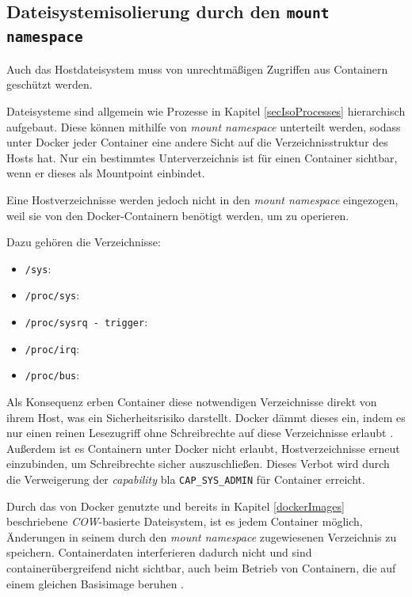 \documentclass[../main.tex]{subfiles}
\begin{document}

    \subsection{Dateisystemisolierung durch den \texttt{mount namespace}}
			Auch das Hostdateisystem muss von unrechtmäßigen Zugriffen aus Containern geschützt werden.

			Dateisysteme sind allgemein wie Prozesse in Kapitel \ref{secIsoProcesses} hierarchisch aufgebaut. Diese können mithilfe von \emph{mount namespace} unterteilt werden, sodass unter Docker jeder Container eine andere Sicht auf die Verzeichnisstruktur des Hosts hat. Nur ein bestimmtes Unterverzeichnis ist für einen Container sichtbar, wenn er dieses als Mountpoint einbindet.

			Eine Hostverzeichnisse werden jedoch nicht in den \emph{mount namespace} eingezogen, weil sie von den Docker-Containern benötigt werden, um zu operieren.

			Dazu gehören die Verzeichnisse:

			\begin{itemize}
				\item \texttt{/sys}:
				\item \texttt{/proc/sys}:
				\item \texttt{/proc/sysrq - trigger}:
				\item \texttt{/proc/irq}:
				\item \texttt{/proc/bus}:
			\end{itemize}

			Als Konsequenz erben Container diese notwendigen Verzeichnisse direkt von ihrem Host, was ein Sicherheitsrisiko darstellt. Docker dämmt dieses ein, indem es nur einen reinen Lesezugriff ohne Schreibrechte auf diese Verzeichnisse erlaubt \cite[S.4]{dockerSecIntro}. Außerdem ist es Containern unter Docker nicht erlaubt, Hostverzeichnisse erneut einzubinden, um Schreibrechte sicher auszuschließen. Dieses Verbot wird durch die Verweigerung der \emph{capability} bla \texttt{CAP\_SYS\_ADMIN} für Container erreicht.

			Durch das von Docker genutzte und bereits in Kapitel \ref{dockerImages} beschriebene \emph{\acrshort{COW}}-basierte Dateisystem, ist es jedem Container möglich, Änderungen in seinem durch den \emph{mount namespace} zugewiesenen Verzeichnis zu speichern. Containerdaten interferieren dadurch nicht und sind containerübergreifend nicht sichtbar, auch beim Betrieb von Containern, die auf einem gleichen Basisimage beruhen \cite[S.4]{dockerSecIntro}.
\end{document}
